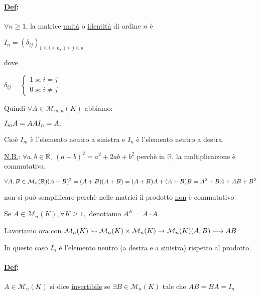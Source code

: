 \documentclass{article}
\newcommand{\ul}[1]{\underline{#1}}
\newcommand{\A}{\mathbb{A}}
\newcommand{\R}{\mathbb{R}}
\newcommand{\M}{\mathcal{M}}
\newcommand{\Def}[2]{\paragraph{\ul{Def}:}#1\\\hspace*{3em}\begin{minipage}{.8\textwidth}#2\end{minipage}}
\begin{document}
\Def{$\forall n\ge1$, la matrice \ul{unità} o \ul{identità} di ordine $n$ è}{
	$I_n=(\delta_{ij})_{1\le i\le n,\ 1\le j\le n}$

	dove

	$\delta_{ij}=\begin{cases}1\ se\ i=j\\0\ se\ i\not=j\end{cases}$

	Quindi $\forall A\in\M_{m,n}(K)$ abbiamo:

	$I_mA=A\\AI_n=A,$

	Cioè $I_m$ è l'elemento neutro a sinistra e $I_n$ è l'elemento neutro a destra.

	\ul{N.B.}: $\forall a,b\in\R,\ (a+b)^2=a^2+2ab+b^2$ perchè in $\R$, la moltiplicaizone è commutativa.

	$\forall A,B\in\M_n(\R)\\(A+B)^2=\\(A+B)(A+B)=\\(A+B)A+(A+B)B=\\A^2+BA+AB+B^2$

	non si può semplificare perchè nelle matrici il prodotto \ul{non} è commutativo

	Se $A\in\M_n(K),\forall K\ge1,\text{ denotiamo }A^K=A\cdot A$
}

Lavoriamo ora con $\M_n(K)\rightsquigarrow\M_n(K)\times\M_n(K)\rightarrow\M_n(K)\\(A,B)\longmapsto AB$

In questo caso $I_n$ è l'elemento neutro (a destra e a sinistra) rispetto al prodotto.

\Def{$A\in \M_n(K)$ si dice \ul{invertibile} se $\exists B\in \M_n(K)$ tale che $AB=BA=I_n$}{}
\end{document}
